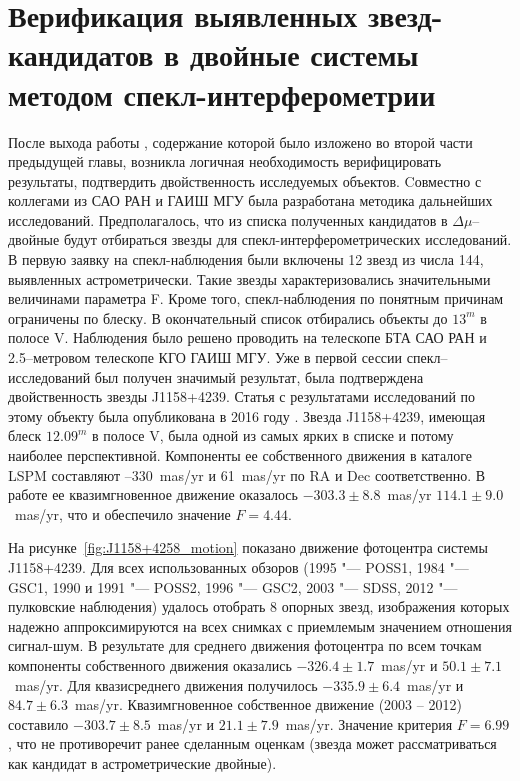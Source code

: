 \chapter{Верификация выявленных звезд-кандидатов в двойные системы методом спекл-интерферометрии} \label{ch:ch5}
После выхода работы \cite{2015AstL...41..883K}, содержание которой было изложено во второй части предыдущей главы, возникла логичная необходимость верифицировать результаты, подтвердить двойственность исследуемых объектов. Cовместно с коллегами из САО РАН и ГАИШ МГУ была разработана методика дальнейших исследований. Предполагалось, что из списка полученных кандидатов в $\Delta\mu$--двойные будут отбираться звезды для спекл-интерферометрических исследований.
В первую заявку на спекл-наблюдения были включены 12 звезд из числа 144, выявленных астрометрически. Такие звезды характеризовались значительными величинами параметра F. Кроме того, спекл-наблюдения по понятным причинам ограничены по блеску. В окончательный список отбирались объекты до $13^m$ в полосе V.
 Наблюдения было решено проводить на телескопе БТА САО РАН и 2.5--метровом телескопе КГО ГАИШ МГУ. Уже в первой сессии спекл--исследований был получен  значимый результат, была подтверждена двойственность звезды J1158+4239. Статья с результатами исследований по этому объекту была опубликована в 2016 году \cite{2016AstL...41..686K}.
Звезда J1158+4239, имеющая блеск $12.09^m$ в полосе V, была одной из самых ярких в списке и потому наиболее перспективной. Компоненты ее собственного движения в каталоге LSPM составляют --330~mas/yr и 61~mas/yr по RA и Dec соответственно. В работе \cite{2011AstL...37..420K} ее квазимгновенное движение оказалось  $-303.3\pm 8.8$~mas/yr   $114.1\pm9.0$~mas/yr, что и обеспечило значение $F = 4.44$.

На рисунке~\ref{fig:J1158+4258_motion} показано движение фотоцентра системы J1158+4239. Для всех использованных обзоров (1995 "--- POSS1, 1984 "--- GSC1, 1990 и 1991 "--- POSS2, 1996 "--- GSC2, 2003 "--- SDSS, 2012 "--- пулковские наблюдения) удалось отобрать 8 опорных звезд, изображения которых надежно аппроксимируются на всех снимках с приемлемым значением отношения сигнал-шум. В результате для среднего движения фотоцентра по всем точкам компоненты собственного движения оказались $-326.4\pm1.7$~mas/yr и $50.1\pm7.1$~mas/yr. Для квазисреднего движения получилось $-335.9\pm6.4$~mas/yr и   $84.7\pm6.3$~mas/yr. Квазимгновенное собственное движение (2003 -- 2012) составило $-303.7\pm8.5$~mas/yr    и   $21.1\pm7.9$~mas/yr. Значение критерия $F = 6.99$, что не противоречит ранее сделанным оценкам (звезда может рассматриваться как кандидат в астрометрические двойные).

